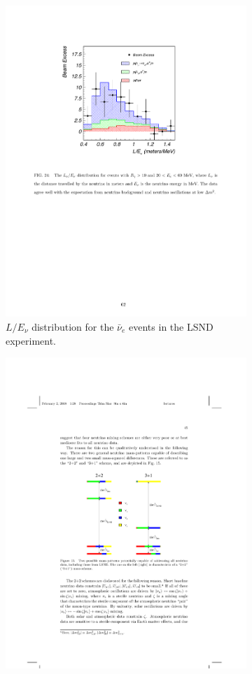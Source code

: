 \begin{figure}[htbp]
  \begin{subfigure}{0.45\textwidth}
    \includegraphics[height=\linewidth]{figures/lsndresult.pdf}
    \caption{$L/E_{\nu}$ distribution for the $\bar{\nu}_{e}$ events in the LSND experiment.}\label{fig:resultlsnd}
  \end{subfigure}\hfill
  \begin{subfigure}{0.45\textwidth}
    \begin{center}
        \includegraphics[height=\linewidth]{figures/masslsnd.pdf}

\end{center}
\end{subfigure}
\end{figure}
